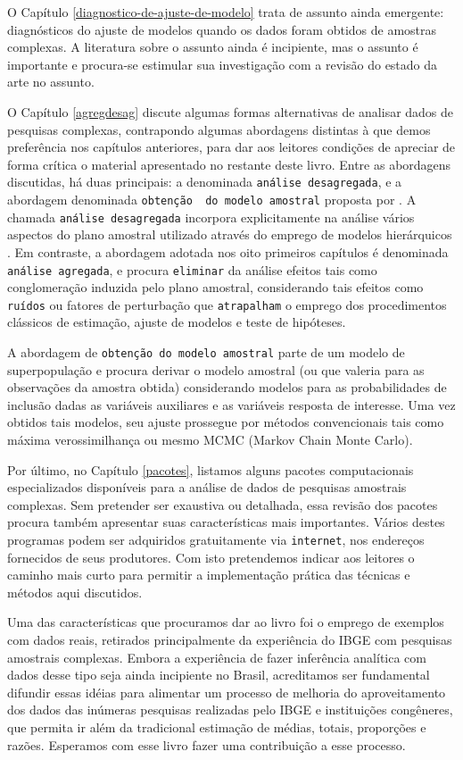 \documentclass[]{book}
\theoremstyle{definition}
\theoremstyle{definition}
\theoremstyle{remark}
\begin{document}
O Capítulo \ref{diagnostico-de-ajuste-de-modelo} trata de assunto ainda
emergente: diagnósticos do ajuste de modelos quando os dados foram
obtidos de amostras complexas. A literatura sobre o assunto ainda é
incipiente, mas o assunto é importante e procura-se estimular sua
investigação com a revisão do estado da arte no assunto.

O Capítulo \ref{agregdesag} discute algumas formas alternativas de
analisar dados de pesquisas complexas, contrapondo algumas abordagens
distintas à que demos preferência nos capítulos anteriores, para dar aos
leitores condições de apreciar de forma crítica o material apresentado
no restante deste livro. Entre as abordagens discutidas, há duas
principais: a denominada \texttt{análise\ desagregada}, e a abordagem
denominada \texttt{obtenção\ \ do\ modelo\ amostral} proposta por
\citep{PKR}. A chamada \texttt{análise\ desagregada} incorpora
explicitamente na análise vários aspectos do plano amostral utilizado
através do emprego de modelos hierárquicos \citep{bryk}. Em contraste, a
abordagem adotada nos oito primeiros capítulos é denominada
\texttt{análise\ agregada}, e procura \texttt{eliminar} da análise
efeitos tais como conglomeração induzida pelo plano amostral,
considerando tais efeitos como \texttt{ruídos} ou fatores de perturbação
que \texttt{atrapalham} o emprego dos procedimentos clássicos de
estimação, ajuste de modelos e teste de hipóteses.

A abordagem de \texttt{obtenção\ do\ modelo\ amostral} parte de um
modelo de superpopulação e procura derivar o modelo amostral (ou que
valeria para as observações da amostra obtida) considerando modelos para
as probabilidades de inclusão dadas as variáveis auxiliares e as
variáveis resposta de interesse. Uma vez obtidos tais modelos, seu
ajuste prossegue por métodos convencionais tais como máxima
verossimilhança ou mesmo MCMC (Markov Chain Monte Carlo).

Por último, no Capítulo \ref{pacotes}, listamos alguns pacotes
computacionais especializados disponíveis para a análise de dados de
pesquisas amostrais complexas. Sem pretender ser exaustiva ou detalhada,
essa revisão dos pacotes procura também apresentar suas características
mais importantes. Vários destes programas podem ser adquiridos
gratuitamente via \texttt{internet}, nos endereços fornecidos de seus
produtores. Com isto pretendemos indicar aos leitores o caminho mais
curto para permitir a implementação prática das técnicas e métodos aqui
discutidos.

Uma das características que procuramos dar ao livro foi o emprego de
exemplos com dados reais, retirados principalmente da experiência do
IBGE com pesquisas amostrais complexas. Embora a experiência de fazer
inferência analítica com dados desse tipo seja ainda incipiente no
Brasil, acreditamos ser fundamental difundir essas idéias para alimentar
um processo de melhoria do aproveitamento dos dados das inúmeras
pesquisas realizadas pelo IBGE e instituições congêneres, que permita ir
além da tradicional estimação de médias, totais, proporções e razões.
Esperamos com esse livro fazer uma contribuição a esse processo.
\end{document}
